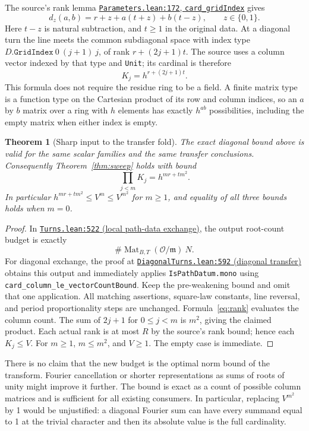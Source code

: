 \documentclass[11pt]{article}
\newtheorem{theorem}{Theorem}[section]
\newcommand{\code}[1]{\texttt{#1}}
\newcommand{\base}{https://github.com/VladimirReshetnikov/ProveIt/blob/835c3695d07c0f77060c5cc63f92eeb52a7d21c2/Analysis/GeneralizedRiemannHypothesis}
\newcommand{\auxlink}[3]{\href{\base/Lean/grh/src/New/Determinant/AuxiliaryForms/#1.lean\#L#2}{\texttt{#1.lean:#2} (#3)}}
\begin{document}
The source's rank lemma \href{\base/Lean/grh/src/New/UpperBound/Objects/Parameters.lean\#L172}{\texttt{Parameters.lean:172}, \texttt{card\_gridIndex}} gives
\begin{equation}\label{eq:rank}
d_z(a,b)=r+z+a(t+z)+b(t-z),\qquad z\in\{0,1\}.
\end{equation}
Here $t-z$ is natural subtraction, and $t\ge 1$ in the original data. At a diagonal turn the line meets the common subdiagonal space with index type $D.\code{GridIndex}\ 0\ (j+1)\ j$, of rank $r+(2j+1)t$. The source uses a column vector indexed by that type and \code{Unit}; its cardinal is therefore
\[
K_j=h^{r+(2j+1)t}.
\]
This formula does not require the residue ring to be a field. A finite matrix type is a function type on the Cartesian product of its row and column indices, so an $a$ by $b$ matrix over a ring with $h$ elements has exactly $h^{ab}$ possibilities, including the empty matrix when either index is empty.

\begin{theorem}[Sharp input to the transfer fold]\label{thm:exact}
The exact diagonal bound above is valid for the same scalar families and the same transfer conclusions. Consequently Theorem~\ref{thm:sweep} holds with bound
\[
\boxed{\prod_{j<m}K_j=h^{mr+t m^2}.}
\]
In particular $h^{mr+t m^2}\le V^m\le V^{m^2}$ for $m\ge1$, and equality of all three bounds holds when $m=0$.
\end{theorem}
\begin{proof}
In \auxlink{Turns}{522}{local path-data exchange}, the output root-count budget is exactly
\[
\#\operatorname{Mat}_{B,T}(\mathcal O/\mathfrak m)\ N.
\]
For diagonal exchange, the proof at \auxlink{DiagonalTurns}{592}{diagonal transfer} obtains this output and immediately applies \code{IsPathDatum.mono} using \code{card\_column\_le\_vectorCountBound}. Keep the pre-weakening bound and omit that one application. All matching assertions, square-law constants, line reversal, and period proportionality steps are unchanged. Formula~\eqref{eq:rank} evaluates the column count. The sum of $2j+1$ for $0\le j<m$ is $m^2$, giving the claimed product. Each actual rank is at most $R$ by the source's rank bound; hence each $K_j\le V$. For $m\ge1$, $m\le m^2$, and $V\ge1$. The empty case is immediate.
\end{proof}

There is no claim that the new budget is the optimal norm bound of the transform. Fourier cancellation or shorter representations as sums of roots of unity might improve it further. The bound is exact as a count of possible column matrices and is sufficient for all existing consumers. In particular, replacing $V^{m^2}$ by 1 would be unjustified: a diagonal Fourier sum can have every summand equal to 1 at the trivial character and then its absolute value is the full cardinality.
\end{document}
